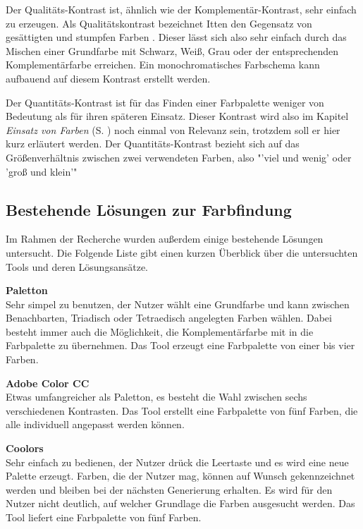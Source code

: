 Der Qualitäts-Kontrast ist, ähnlich wie der Komplementär-Kontrast, sehr einfach zu erzeugen. Als Qualitätskontrast bezeichnet Itten den Gegensatz von gesättigten und stumpfen Farben \cite[S. 55]{Itten201006}. Dieser lässt sich also sehr einfach durch das Mischen einer Grundfarbe mit Schwarz, Weiß, Grau oder der entsprechenden Komplementärfarbe erreichen.
Ein monochromatisches Farbschema kann aufbauend auf diesem Kontrast erstellt werden.

Der Quantitäts-Kontrast ist für das Finden einer Farbpalette weniger von Bedeutung als für ihren späteren Einsatz. Dieser Kontrast wird also im Kapitel \textit{Einsatz von Farben} (S. \pageref{einsatz}) noch einmal von Relevanz sein, trotzdem soll er hier kurz erläutert werden. Der Quantitäts-Kontrast bezieht sich auf das Größenverhältnis zwischen zwei verwendeten Farben, also "'viel und wenig' oder 'groß und klein'" \cite[S. 59]{Itten201006}


\subsection{Bestehende Lösungen zur Farbfindung}
Im Rahmen der Recherche wurden außerdem einige bestehende Lösungen untersucht. Die Folgende Liste gibt einen kurzen Überblick über die untersuchten Tools und deren Lösungsansätze.

\textbf{Paletton} \\
Sehr simpel zu benutzen, der Nutzer wählt eine Grundfarbe und kann zwischen Benachbarten, Triadisch oder Tetraedisch angelegten Farben wählen. Dabei besteht immer auch die Möglichkeit, die Komplementärfarbe mit in die Farbpalette zu übernehmen. Das Tool erzeugt eine Farbpalette von einer bis vier Farben.

\textbf{Adobe Color CC} \\
Etwas umfangreicher als Paletton, es besteht die Wahl zwischen sechs verschiedenen Kontrasten. Das Tool erstellt eine Farbpalette von fünf Farben, die alle individuell angepasst werden können.

\textbf{Coolors} \\
Sehr einfach zu bedienen, der Nutzer drück die Leertaste und es wird eine neue Palette erzeugt. Farben, die der Nutzer mag, können auf Wunsch gekennzeichnet werden und bleiben bei der nächsten Generierung erhalten. Es wird für den Nutzer nicht deutlich, auf welcher Grundlage die Farben ausgesucht werden. Das Tool liefert eine Farbpalette von fünf Farben.

